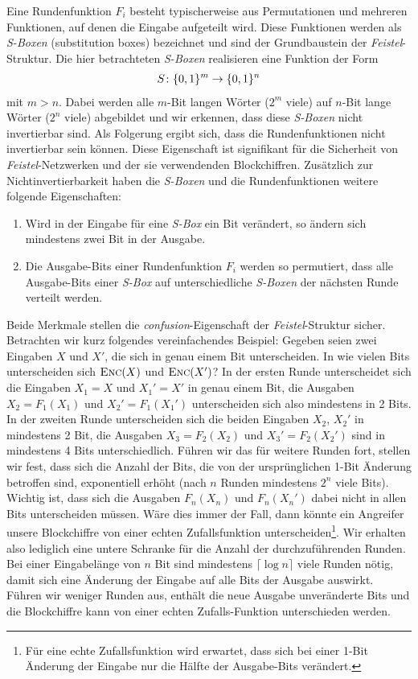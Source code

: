 Eine Rundenfunktion \(F_i\) besteht typischerweise aus Permutationen und mehreren Funktionen, auf denen die Eingabe aufgeteilt wird. Diese Funktionen werden als \textit{S-Boxen} (substitution boxes) bezeichnet und sind der Grundbaustein der \textit{Feistel}-Struktur. Die hier betrachteten \textit{S-Boxen} realisieren eine Funktion der Form
\begin{align*}
S \colon \{0, 1\}^m \rightarrow \{0, 1\}^n
\end{align*}
mit \(m > n\). Dabei werden alle $m$-Bit langen Wörter (\(2^m\) viele) auf $n$-Bit lange Wörter (\(2^n\) viele) abgebildet und wir erkennen, dass diese \textit{S-Boxen} nicht invertierbar sind. Als Folgerung ergibt sich, dass die Rundenfunktionen nicht invertierbar sein können. Diese Eigenschaft ist signifikant für die Sicherheit von \textit{Feistel}-Netzwerken und der sie verwendenden Blockchiffren. Zusätzlich zur Nichtinvertierbarkeit haben die \textit{S-Boxen} und die Rundenfunktionen weitere folgende Eigenschaften:

\begin{enumerate}
	\item Wird in der Eingabe für eine \textit{S-Box} ein Bit verändert, so ändern sich mindestens zwei Bit in der Ausgabe.
	\item Die Ausgabe-Bits einer Rundenfunktion $F_i$ werden so permutiert, dass alle Ausgabe-Bits einer \textit{S-Box} auf unterschiedliche \textit{S-Boxen} der nächsten Runde verteilt werden.
\end{enumerate}

Beide Merkmale stellen die \textit{confusion}-Eigenschaft der \textit{Feistel}-Struktur sicher. Betrachten wir kurz folgendes vereinfachendes Beispiel:
Gegeben seien zwei Eingaben $X$ und $X'$, die sich in genau einem Bit unterscheiden. In wie vielen Bits unterscheiden sich $\textsc{Enc}(X)$ und $\textsc{Enc}(X')$? 
In der ersten Runde unterscheidet sich die Eingaben $X_1 = X$ und $X_1' = X'$ in genau einem Bit, die Ausgaben $X_2 = F_1(X_1)$ und $X_2' = F_1(X_1')$ unterscheiden sich also mindestens in 2 Bits. In der zweiten Runde unterscheiden sich die beiden Eingaben $X_2$, $X_2'$ in mindestens 2 Bit, die Ausgaben $X_3 = F_2(X_2)$ und $X_3' = F_2(X_2')$ sind in mindestens 4 Bits unterschiedlich. Führen wir das für weitere Runden fort, stellen wir fest, dass sich die Anzahl der Bits, die von der ursprünglichen 1-Bit Änderung betroffen sind, exponentiell erhöht (nach $n$ Runden mindestens $2^n$ viele Bits).
Wichtig ist, dass sich die Ausgaben $F_n(X_n)$ und $F_n(X_n')$ dabei nicht in allen Bits unterscheiden müssen. Wäre dies immer der Fall, dann könnte ein Angreifer unsere Blockchiffre von einer echten Zufallsfunktion unterscheiden\footnote{Für eine echte Zufallsfunktion wird erwartet, dass sich bei einer 1-Bit Änderung der Eingabe nur die Hälfte der Ausgabe-Bits verändert.}. Wir erhalten also lediglich eine untere Schranke für die Anzahl der durchzuführenden Runden. Bei einer Eingabelänge von $n$ Bit sind mindestens $ \lceil \log n \rceil$ viele Runden nötig, damit sich eine Änderung der Eingabe auf alle Bits der Ausgabe auswirkt. Führen wir weniger Runden aus, enthält die neue Ausgabe unveränderte Bits und die Blockchiffre kann von einer echten Zufalls-Funktion unterschieden werden.

